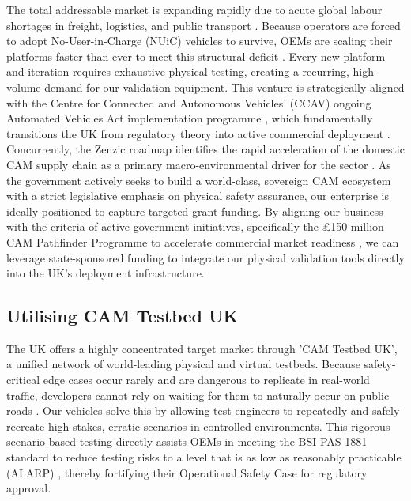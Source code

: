 The total addressable market is expanding rapidly due to acute global labour shortages in freight, logistics, and public transport \cite[p.~6]{wef_2021}. Because operators are forced to adopt No-User-in-Charge (NUiC) vehicles to survive, OEMs are scaling their platforms faster than ever to meet this structural deficit \cite[p.~9,11,17]{cracknell_2023}. Every new platform and iteration requires exhaustive physical testing, creating a recurring, high-volume demand for our validation equipment.  
This venture is strategically aligned with the Centre for Connected and Autonomous Vehicles' (CCAV) ongoing Automated Vehicles Act implementation programme \cite{lawcom_avs_2024}, which fundamentally transitions the UK from regulatory theory into active commercial deployment %
. Concurrently, the Zenzic roadmap identifies the rapid acceleration of the domestic CAM supply chain as a primary macro-environmental driver for the sector \cite[p.~9,10,19]{cracknell_2023}. As the government actively seeks to build a world-class, sovereign CAM ecosystem with a strict legislative emphasis on physical safety assurance, our enterprise is ideally positioned to capture targeted grant funding. By aligning our business with the criteria of active government initiatives, specifically the £150 million CAM Pathfinder Programme to accelerate commercial market readiness \cite{pockney_2026}, we can leverage state-sponsored funding to integrate our physical validation tools directly into the UK's deployment infrastructure.

\subsection{Utilising CAM Testbed UK}

The UK offers a highly concentrated target market through 'CAM Testbed UK', a unified network of world-leading physical and virtual testbeds. Because safety-critical edge cases occur rarely and are dangerous to replicate in real-world traffic, developers cannot rely on waiting for them to naturally occur on public roads \cite[p.~12]{chen_2024}. Our vehicles solve this by allowing test engineers to repeatedly and safely recreate high-stakes, erratic scenarios in controlled environments. This rigorous scenario-based testing directly assists OEMs in meeting the BSI PAS 1881 standard to reduce testing risks to a level that is as low as reasonably practicable (ALARP) \cite[p.~1]{pas1881}, thereby fortifying their Operational Safety Case for regulatory approval.

